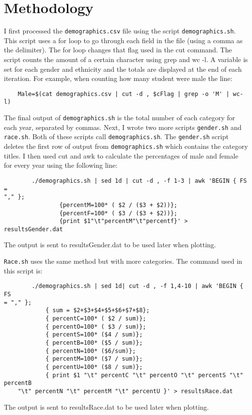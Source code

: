 \documentclass{article}
\begin{document}
\section*{Methodology}
    I first processed the \verb|demographics.csv| file using the script 
\verb|demographics.sh|.  This script uses a for loop to go through each 
field in the file (using a comma as the delimiter).  The for loop 
changes that flag used in the cut command.  The script counts the amount 
of a certain character using grep and wc -l.  A variable is set for each 
gender and ethnicity and the totals are displayed at the end of each 
iteration.  For example, when counting how many student were male the 
line:
    \begin{verbatim}
    Male=$(cat demographics.csv | cut -d , $cFlag | grep -o 'M' | wc-l)
    \end{verbatim}
    The final output of \verb|demographics.sh| is the total number of 
each category for each year, separated by commas.  Next, I wrote two 
more scripts \verb|gender.sh| and \verb|race.sh|.  Both of these scripts 
call \verb|demographics.sh|. The \verb|gender.sh| script deletes the 
first row of output from \verb|demographics.sh| which contains the 
category titles.  I then used cut and awk to calculate the percentages 
of male and female for every year using the following line:
    \begin{verbatim}
        ./demographics.sh | sed 1d | cut -d , -f 1-3 | awk 'BEGIN { FS = 
"," };
                {percentM=100* ( $2 / ($3 + $2))};
                {percentF=100* ( $3 / ($3 + $2))};
                {print $1"\t"percentM"\t"percentf}' > resultsGender.dat
    \end{verbatim}
        The output is sent to resultsGender.dat to be used later when 
plotting.
    
    
    \verb|Race.sh| uses the same method but with more categories.  The 
command used in this script is:
    \begin{verbatim}
        ./demographics.sh | sed 1d| cut -d , -f 1,4-10 | awk 'BEGIN { FS 
= "," };
            { sum = $2+$3+$4+$5+$6+$7+$8};
            { percentC=100* ( $2 / sum)};
            { percentO=100* ( $3 / sum)};
            { percentS=100* ($4 / sum)};
            { percentB=100* ($5 / sum)};
            { percentN=100* ($6/sum)};
            { percentM=100* ($7 / sum)};
            { percentU=100* ($8 / sum)};
            { print $1 "\t" percentC "\t" percentO "\t" percentS "\t" 
percentB
    "\t" percentN "\t" percentM "\t" percentU }' > resultsRace.dat
    \end{verbatim}
        The output is sent to resultsRace.dat to be used later when 
plotting.
    
\end{document}
